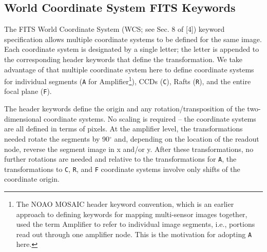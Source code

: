 \documentclass{article}[12pt]
\begin{document}




\subsection{World Coordinate System FITS Keywords}
The FITS World Coordinate System (WCS; see Sec. 8 of [4]) keyword specification allows multiple coordinate systems to be defined for the same image.  Each coordinate system is designated by a single letter; the letter is appended to the corresponding header keywords that define the transformation.  We take advantage of that multiple coordinate system here to define coordinate systems for individual segments ({\tt A} for Amplifier\footnote{The NOAO MOSAIC header keyword convention, which is an earlier approach to defining keywords for mapping multi-sensor images together, used the term Amplifier to refer to individual image segments, i.e., portions read out through one amplifier node.  This is the motivation for adopting {\tt A} here.}), CCDs ({\tt C}), Rafts ({\tt R}), and the entire focal plane ({\tt F}). 

The header keywords define the origin and any rotation/transposition of the two-dimensional coordinate systems.   No scaling is required -- the coordinate systems are all defined in terms of pixels.  At the amplifier level, the transformations needed rotate the segments by 90$^\circ$ and, depending on the location of the readout node, reverse the segment image in x and/or y.  After these transformations, no further rotations are needed and relative to the transformations for {\tt A}, the transformations to {\tt C}, {\tt R}, and {\tt F} coordinate systems involve only shifts of the coordinate origin.
\end{document}
